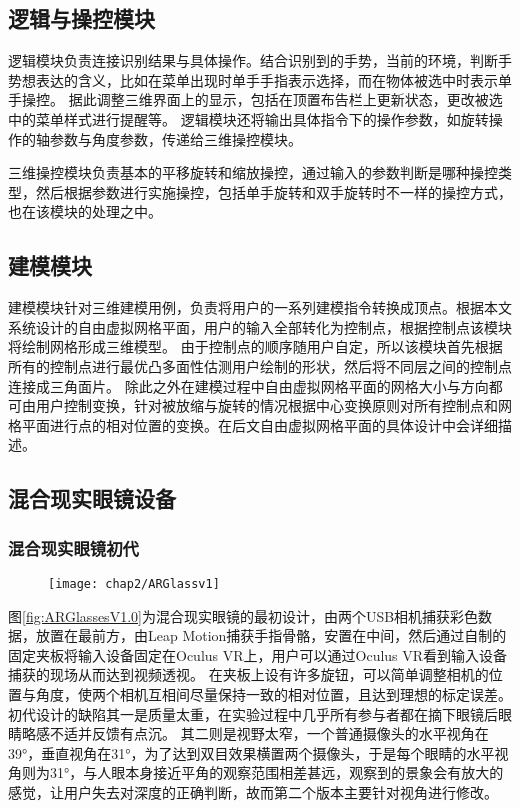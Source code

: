 \subsection{逻辑与操控模块}
\label{sec:logic}
逻辑模块负责连接识别结果与具体操作。结合识别到的手势，当前的环境，判断手势想表达的含义，比如在菜单出现时单手手指表示选择，而在物体被选中时表示单手操控。
据此调整三维界面上的显示，包括在顶置布告栏上更新状态，更改被选中的菜单样式进行提醒等。
逻辑模块还将输出具体指令下的操作参数，如旋转操作的轴参数与角度参数，传递给三维操控模块。

三维操控模块负责基本的平移旋转和缩放操控，通过输入的参数判断是哪种操控类型，然后根据参数进行实施操控，包括单手旋转和双手旋转时不一样的操控方式，也在该模块的处理之中。

\subsection{建模模块}
\label{sec:model}
建模模块针对三维建模用例，负责将用户的一系列建模指令转换成顶点。根据本文系统设计的自由虚拟网格平面，用户的输入全部转化为控制点，根据控制点该模块将绘制网格形成三维模型。
由于控制点的顺序随用户自定，所以该模块首先根据所有的控制点进行最优凸多面性估测用户绘制的形状，然后将不同层之间的控制点连接成三角面片。
除此之外在建模过程中自由虚拟网格平面的网格大小与方向都可由用户控制变换，针对被放缩与旋转的情况根据中心变换原则对所有控制点和网格平面进行点的相对位置的变换。在后文自由虚拟网格平面的具体设计中会详细描述。

\subsection{混合现实眼镜设备}
\label{chap:ARGlasses}

\subsubsection{混合现实眼镜初代}
\begin{figure}[!htp]
  \centering
  \texttt{[image: chap2/ARGlassv1]}
\end{figure}
图\ref{fig:ARGlassesV1.0}为混合现实眼镜的最初设计，由两个USB相机捕获彩色数据，放置在最前方，由Leap Motion捕获手指骨骼，安置在中间，然后通过自制的固定夹板将输入设备固定在Oculus VR上，用户可以通过Oculus VR看到输入设备捕获的现场从而达到视频透视。
在夹板上设有许多旋钮，可以简单调整相机的位置与角度，使两个相机互相间尽量保持一致的相对位置，且达到理想的标定误差。
初代设计的缺陷其一是质量太重，在实验过程中几乎所有参与者都在摘下眼镜后眼睛略感不适并反馈有点沉。
其二则是视野太窄，一个普通摄像头的水平视角在39°，垂直视角在31°，为了达到双目效果横置两个摄像头，于是每个眼睛的水平视角则为31°，与人眼本身接近平角的观察范围相差甚远，观察到的景象会有放大的感觉，让用户失去对深度的正确判断，故而第二个版本主要针对视角进行修改。

